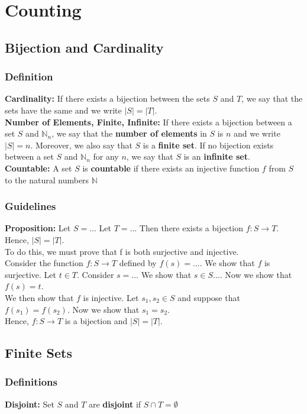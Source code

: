 \documentclass[12pt]{report}
\begin{document}
\chapter{Counting}
	\section{Bijection and Cardinality}
		\subsection{Definition}
			\textbf{Cardinality:} If there exists a bijection between the sets $S$ and $T$, we say that the sets have the same and we write $|S| = |T|$. \\
			\textbf{Number of Elements, Finite, Infinite:} If there exists a bijection between a set $S$ and $\mathbb{N}_n$, we say that the \textbf{number of elements} in $S$ is $n$ and we write $|S| = n$. Moreover, we also say that $S$ is a \textbf{finite set}. If no bijection exists between a set $S$ and $\mathbb{N}_n$ for any $n$, we say that $S$ is an \textbf{infinite set}.\\
			\textbf{Countable: } A set $S$ is \textbf{countable} if there exists an injective function $f$ from $S$ to the natural numbers $\mathbb{N}$
		\subsection{Guidelines}
			\textbf{Proposition:} Let $S = ...$ Let $T = ...$ Then there exists a bijection $f: S \rightarrow T$. Hence, $|S| = |T|$. \\
			To do this, we must prove that f is both surjective and injective. \\
			Consider the function $f:S \rightarrow T$ defined by $f(s) = ...$. We show that $f$ is surjective. Let $t \in T$. Consider $s = ...$ We show that $s \in S ...$. Now we show that $f(s) = t$.\\ We then show that $f$ is injective. Let $s_1, s_2 \in S$ and suppose that $f(s_1) = f(s_2)$. Now we show that $s_1 = s_2$.\\
			Hence, $f:S \rightarrow T$ is a bijection and $|S| = |T|$.
	\section{Finite Sets}
		\subsection{Definitions}
			\textbf{Disjoint:} Set $S$ and $T$ are \textbf{disjoint} if $S \cap T = \emptyset$
			
\end{document}
